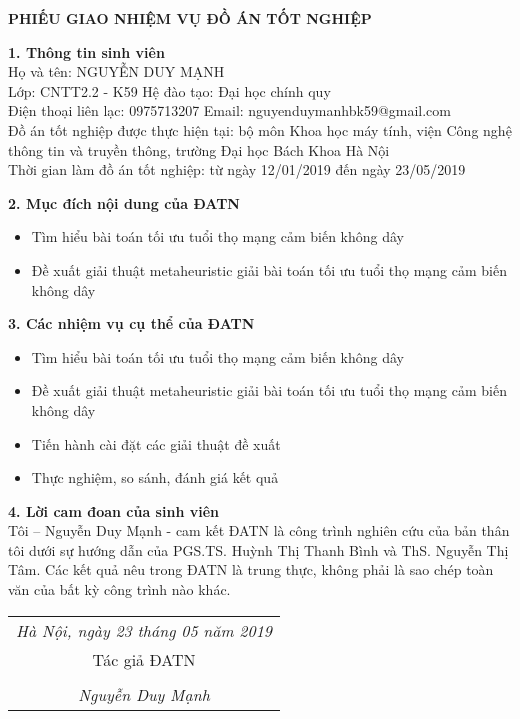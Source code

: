 \begin{center}
    \textbf{PHIẾU GIAO NHIỆM VỤ ĐỒ ÁN TỐT NGHIỆP}
\end{center}

\textbf{1. Thông tin sinh viên}
\\Họ và tên: NGUYỄN DUY MẠNH 
\\Lớp: CNTT2.2 - K59 \qquad\qquad\qquad\qquad\qquad{ }{} Hệ đào tạo: Đại học chính quy 
\\Điện thoại liên lạc: 0975713207 \qquad Email: nguyenduymanhbk59@gmail.com 
\\Đồ án tốt nghiệp được thực hiện tại: bộ môn Khoa học máy tính, viện Công nghệ thông tin và truyền thông, trường Đại học Bách Khoa Hà Nội
\\Thời gian làm đồ án tốt nghiệp: từ ngày 12/01/2019 đến ngày 23/05/2019

\textbf{2. Mục đích nội dung của ĐATN}
\begin{itemize}
    \item Tìm hiểu bài toán tối ưu tuổi thọ mạng cảm biến không dây 
    \item Đề xuất giải thuật metaheuristic giải bài toán tối ưu tuổi thọ mạng cảm biến không dây 
\end{itemize}

\textbf{3. Các nhiệm vụ cụ thể của ĐATN}
\begin{itemize}
    \item Tìm hiểu bài toán tối ưu tuổi thọ mạng cảm biến không dây 
    \item Đề xuất giải thuật metaheuristic giải bài toán tối ưu tuổi thọ mạng cảm biến không dây 
    \item Tiến hành cài đặt các giải thuật đề xuất 
    \item Thực nghiệm, so sánh, đánh giá kết quả 
\end{itemize}

\textbf{4. Lời cam đoan của sinh viên}
\\Tôi – Nguyễn Duy Mạnh - cam kết ĐATN là công trình nghiên cứu của bản thân tôi dưới sự hướng dẫn của PGS.TS. Huỳnh Thị Thanh Bình và ThS. Nguyễn Thị Tâm. Các kết quả nêu trong ĐATN là trung thực, không phải là sao chép toàn văn của bất kỳ công trình nào khác.
\begin{table}[H]
    \raggedleft
    \begin{tabular}{c}
    \textit{Hà Nội, ngày 23 tháng 05  năm 2019} \\
    Tác giả ĐATN                                \\
                                                \\
    \textit{Nguyễn Duy Mạnh}                   
    \end{tabular}
\end{table}

